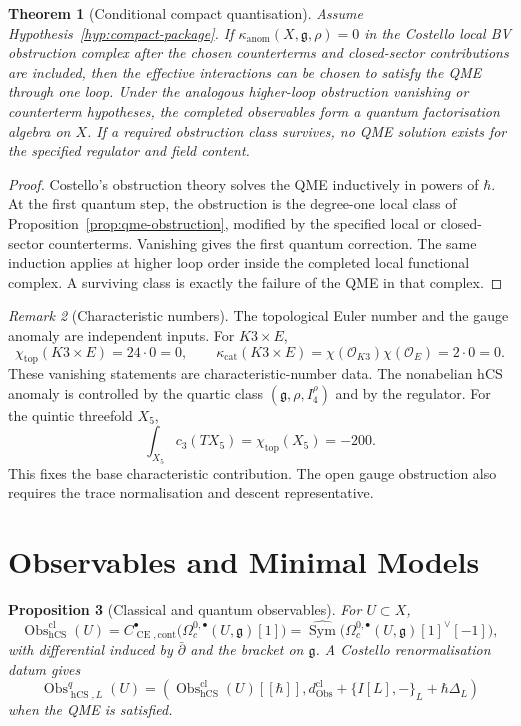 \documentclass[11pt]{amsart}
\providecommand{\dbar}{\bar{\partial}}
\providecommand{\fg}{\mathfrak{g}}
\providecommand{\Sym}{\operatorname{Sym}}
\providecommand{\Obs}{\operatorname{Obs}}
\providecommand{\CE}{\operatorname{CE}}
\providecommand{\hCS}{\operatorname{hCS}}
\providecommand{\cO}{\mathcal{O}}
\providecommand{\kanom}{\kappa_{\operatorname{anom}}}
\providecommand{\kcat}{\kappa_{\mathrm{cat}}}
\theoremstyle{plain}
\newtheorem{theorem}{Theorem}[section]
\newtheorem{proposition}[theorem]{Proposition}
\theoremstyle{definition}
\theoremstyle{remark}
\newtheorem{remark}[theorem]{Remark}
\begin{document}
\begin{theorem}[Conditional compact quantisation]
\label{thm:conditional-compact-quantisation}
Assume Hypothesis~\ref{hyp:compact-package}.  If
$\kanom(X,\fg,\rho)=0$ in the Costello local BV obstruction complex
after the chosen counterterms and closed-sector contributions are
included, then the effective interactions can be chosen to satisfy the
QME through one loop.  Under the analogous higher-loop obstruction
vanishing or counterterm hypotheses, the completed observables form a
quantum factorisation algebra on $X$.  If a required obstruction class
survives, no QME solution exists for the specified regulator and field
content.
\end{theorem}

\begin{proof}
Costello's obstruction theory solves the QME inductively in powers of
$\hbar$.  At the first quantum step, the obstruction is the degree-one
local class of Proposition~\ref{prop:qme-obstruction}, modified by the
specified local or closed-sector counterterms.  Vanishing gives the
first quantum correction.  The same induction applies at higher loop
order inside the completed local functional complex.  A surviving class
is exactly the failure of the QME in that complex.
\end{proof}

\begin{remark}[Characteristic numbers]
\label{rem:characteristic-numbers}
The topological Euler number and the gauge anomaly are independent
inputs.  For $K3\times E$,
\[
  \chi_{\mathrm{top}}(K3\times E)=24\cdot0=0,
  \qquad
  \kcat(K3\times E)=\chi(\cO_{K3})\chi(\cO_E)=2\cdot0=0.
\]
These vanishing statements are characteristic-number data. The
nonabelian hCS anomaly is controlled by the quartic class
$(\fg,\rho,I_4^\rho)$ and by the regulator. For the quintic threefold
$X_5$,
\[
  \int_{X_5}c_3(TX_5)=\chi_{\mathrm{top}}(X_5)=-200.
\]
This fixes the base characteristic contribution. The open gauge
obstruction also requires the trace normalisation and descent
representative.
\end{remark}

\section{Observables and Minimal Models}
\label{sec:observables-minimal-models}

\begin{proposition}[Classical and quantum observables]
\label{prop:observables}
For $U\subset X$,
\[
  \Obs^{\mathrm{cl}}_{\hCS}(U)
  =
  C^\bullet_{\CE,\mathrm{cont}}
  \bigl(\Omega^{0,\bullet}_c(U,\fg)[1]\bigr)
  =
  \widehat{\Sym}
  \bigl(\Omega^{0,\bullet}_c(U,\fg)[1]^\vee[-1]\bigr),
\]
with differential induced by $\dbar$ and the bracket on $\fg$.  A
Costello renormalisation datum gives
\[
  \Obs^q_{\hCS,L}(U)
  =
  \left(
    \Obs^{\mathrm{cl}}_{\hCS}(U)[[\hbar]],
    d_{\Obs}^{\mathrm{cl}}+\{I[L],-\}_L+\hbar\Delta_L
  \right)
\]
when the QME is satisfied.
\end{proposition}
\end{document}
